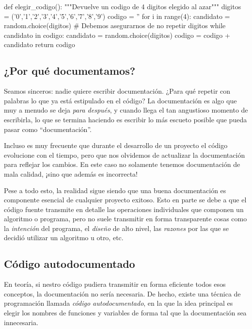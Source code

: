 \begin{codigo-python-sn}
def elegir_codigo():
    """Devuelve un codigo de 4 digitos elegido al azar"""
    digitos = ('0','1','2','3','4','5','6','7','8','9')
    codigo = ''
    for i in range(4):
        candidato = random.choice(digitos)
        # Debemos asegurarnos de no repetir digitos
        while candidato in codigo:
            candidato = random.choice(digitos)
        codigo = codigo + candidato
    return codigo
\end{codigo-python-sn}

\subsection{¿Por qué documentamos?}

Seamos sinceros: nadie quiere escribir documentación. ¿Para qué repetir con
palabras lo que ya está estipulado en el código? La documentación es algo que
muy a menudo se deja \emph{para después}, y cuando llega el tan angustioso
momento de escribirla, lo que se termina haciendo es escribir lo más
escueto posible que pueda pasar como ``documentación''.

Incluso es muy frecuente que durante el desarrollo de un proyecto el código
evolucione con el tiempo, pero que nos olvidemos de actualizar la documentación
para reflejar los cambios. En este caso no solamente tenemos documentación de
mala calidad, ¡sino que además es incorrecta!

Pese a todo esto, la realidad sigue siendo que una buena documentación es
componente esencial de cualquier proyecto exitoso. Esto en parte se debe a que
el código fuente transmite en detalle las operaciones individuales que componen
un algoritmo o programa, pero no suele transmitir en forma transparente cosas
como la \emph{intención} del programa, el \emph{diseño} de alto nivel, las
\emph{razones} por las que se decidió utilizar un algoritmo u otro, etc.

\subsection{Código autodocumentado}

En teoría, si nestro código pudiera transmitir en forma eficiente todos esos
conceptos, la documentación no sería necesaria. De hecho, existe una técnica de
programación llamada \emph{código autodocumentado}, en la que la idea principal
es elegir los nombres de funciones y variables de forma tal que la
documentación sea innecesaria.

